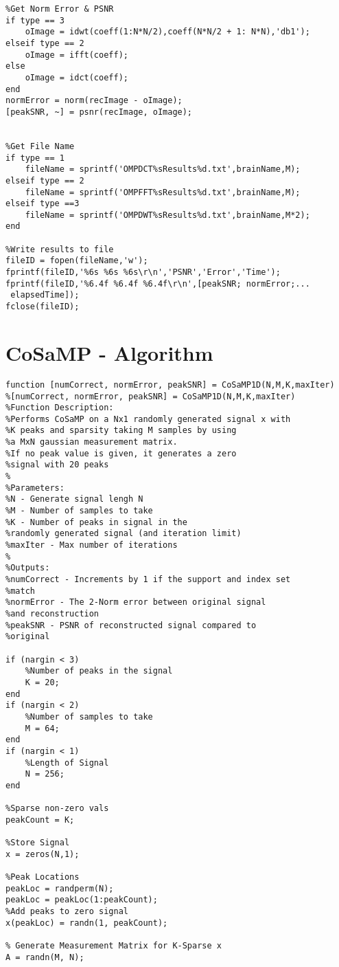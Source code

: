 \documentclass[titlepage,oneside, 12pt]{book}
\theoremstyle{break}
\begin{document}
\begin{appendices}
\begin{lstlisting}
%Get Norm Error & PSNR
if type == 3
    oImage = idwt(coeff(1:N*N/2),coeff(N*N/2 + 1: N*N),'db1');
elseif type == 2
    oImage = ifft(coeff);
else         
    oImage = idct(coeff);
end
normError = norm(recImage - oImage);
[peakSNR, ~] = psnr(recImage, oImage);


%Get File Name
if type == 1
    fileName = sprintf('OMPDCT%sResults%d.txt',brainName,M);
elseif type == 2
    fileName = sprintf('OMPFFT%sResults%d.txt',brainName,M);
elseif type ==3
    fileName = sprintf('OMPDWT%sResults%d.txt',brainName,M*2);
end
    
%Write results to file
fileID = fopen(fileName,'w');
fprintf(fileID,'%6s %6s %6s\r\n','PSNR','Error','Time');
fprintf(fileID,'%6.4f %6.4f %6.4f\r\n',[peakSNR; normError;...
 elapsedTime]);
fclose(fileID);

\end{lstlisting}

\chapter{CoSaMP - Algorithm}
\begin{lstlisting}
function [numCorrect, normError, peakSNR] = CoSaMP1D(N,M,K,maxIter)
%[numCorrect, normError, peakSNR] = CoSaMP1D(N,M,K,maxIter)
%Function Description: 
%Performs CoSaMP on a Nx1 randomly generated signal x with 
%K peaks and sparsity taking M samples by using 
%a MxN gaussian measurement matrix. 
%If no peak value is given, it generates a zero 
%signal with 20 peaks
%
%Parameters:
%N - Generate signal lengh N
%M - Number of samples to take
%K - Number of peaks in signal in the 
%randomly generated signal (and iteration limit)
%maxIter - Max number of iterations
%
%Outputs:
%numCorrect - Increments by 1 if the support and index set
%match
%normError - The 2-Norm error between original signal 
%and reconstruction
%peakSNR - PSNR of reconstructed signal compared to
%original

if (nargin < 3)
    %Number of peaks in the signal 
    K = 20;
end
if (nargin < 2)
    %Number of samples to take
    M = 64;
end
if (nargin < 1)
    %Length of Signal 
    N = 256;
end

%Sparse non-zero vals
peakCount = K; 

%Store Signal
x = zeros(N,1);

%Peak Locations
peakLoc = randperm(N);
peakLoc = peakLoc(1:peakCount); 
%Add peaks to zero signal
x(peakLoc) = randn(1, peakCount);

% Generate Measurement Matrix for K-Sparse x
A = randn(M, N);


\end{lstlisting}
\end{appendices}
\end{document}
